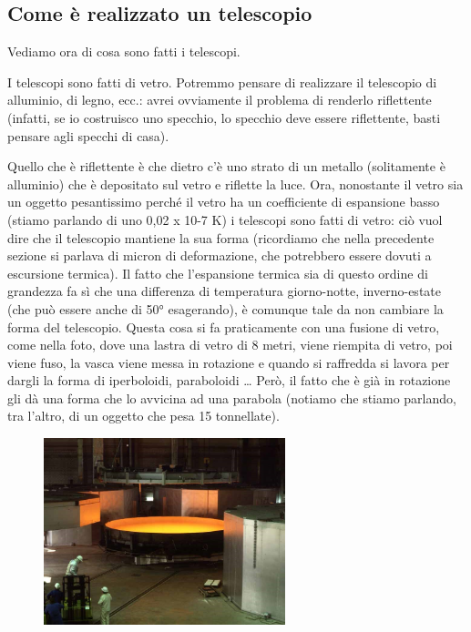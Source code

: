 \documentclass[a4paper,11pt]{article}
\begin{document}
\subsection{Come è realizzato un telescopio}
Vediamo ora di cosa sono fatti i telescopi.

I telescopi sono fatti di vetro. Potremmo pensare di realizzare il telescopio di alluminio, di legno, ecc.: avrei ovviamente il problema di renderlo riflettente (infatti, se io costruisco uno specchio, lo specchio deve essere riflettente, basti pensare agli specchi di casa).

Quello che è riflettente è che dietro c’è uno strato di un metallo (solitamente è alluminio) che è depositato sul vetro e riflette la luce. Ora, nonostante il vetro sia un oggetto pesantissimo perché il vetro ha un coefficiente di espansione basso (stiamo parlando di uno 0,02 x 10-7 K) i telescopi sono fatti di vetro: ciò vuol dire che il telescopio mantiene la sua forma (ricordiamo che nella precedente sezione si parlava di micron di deformazione, che potrebbero essere dovuti a escursione termica). Il fatto che l’espansione termica sia di questo ordine di grandezza fa sì che una differenza di temperatura giorno-notte, inverno-estate (che può essere anche di 50° esagerando), è comunque tale da non cambiare la forma del telescopio. Questa cosa si fa praticamente con una fusione di vetro, come nella foto, dove una lastra di vetro di 8 metri, viene riempita di vetro, poi viene fuso, la vasca viene messa in rotazione e quando si raffredda si lavora per dargli la forma di iperboloidi, paraboloidi … Però, il fatto che è già in rotazione gli dà una forma che lo avvicina ad una parabola (notiamo che stiamo parlando, tra l’altro, di un oggetto che pesa 15 tonnellate).

\begin{figure}[h!!]
        \centering
        \includegraphics[width=7cm]{6.jpg}
        \label{}
    \end{figure}
    
\end{document}
